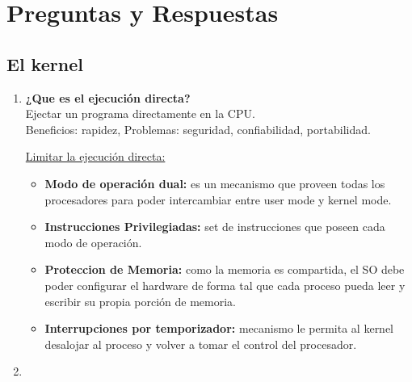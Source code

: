 \documentclass[../main.tex]{subfiles}
\begin{document}
\section{Preguntas y Respuestas}

    \subsection{El kernel}
        \begin{enumerate}
            \item 
                \textbf{¿Que es el ejecución directa?}\\
                Ejectar un programa directamente en la CPU. \\
                Beneficios: rapidez, Problemas: seguridad, confiabilidad, portabilidad.

                \underline{Limitar la ejecución directa:} 
                \begin{itemize}
                    \item \textbf{Modo de operación dual:} es un mecanismo que proveen todas los procesadores para poder intercambiar entre user mode y kernel mode.
                    \item \textbf{Instrucciones Privilegiadas:} set de instrucciones que poseen cada modo de operación.
                    \item \textbf{Proteccion de Memoria:} como la memoria es compartida, el SO debe poder configurar el hardware de forma tal que cada proceso pueda leer y escribir su propia porción de memoria.
                    \item \textbf{Interrupciones por temporizador:} mecanismo le permita al kernel desalojar al proceso y volver a tomar el control del procesador.
                \end{itemize}

            \item 
        \end{enumerate}
\end{document}
